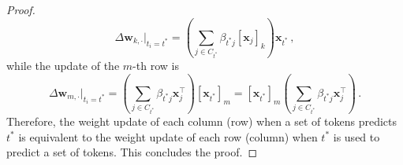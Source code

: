 \begin{proof}
%
\begin{equation}
    \Delta \bm{w}_{k, \cdot} \bigg|_{t_i = t^*} = \left(\sum_{j \in C_{t^*}}\beta_{t^*j}[\bm{x}_j]_k\right)\bm{x}_{t^*} \,,
\end{equation}
%
while the update of the $m$-th row is
%
\begin{equation}
    \Delta \bm{w}_{m, \cdot} \bigg|_{t_i = t^*} =  \left(\sum_{j \in C_{t^*}}\beta_{t^*j}\bm{x}_j^\top\right) [\bm{x}_{t^*}]_m
    = [\bm{x}_{t^*}]_m \left(\sum_{j \in C_{t^*}}\beta_{t^*j}\bm{x}_j^\top\right)\,.
\end{equation}
%
Therefore, the weight update of each column (row) when a set of tokens predicts $t^*$ is equivalent to the weight update of each row (column) when $t^*$ is used to predict a set of tokens.
%
This concludes the proof.
%
\end{proof}